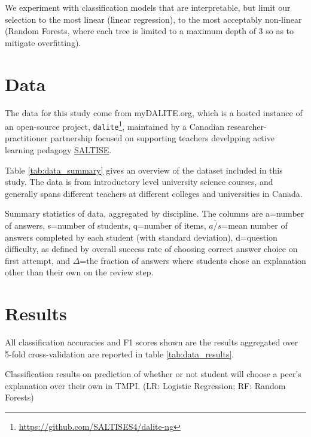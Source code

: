 \documentclass[sigconf]{acmart}
\begin{document}
We experiment with classification models that are interpretable, but limit our 
selection to the most linear (linear regression), to the most acceptably 
non-linear (Random Forests, where each tree is limited to a maximum depth of 3 
so as to mitigate overfitting).


\section{Data}

The data for this study come from myDALITE.org, which is a hosted instance of 
an open-source project, 
\verb|dalite|\footnote{\url{https://github.com/SALTISES4/dalite-ng}}, 
maintained by a Canadian researcher-practitioner partnership focused on 
supporting teachers develpping active learning pedagogy 
\href{saltise.ca}{SALTISE}.

Table \ref{tab:data_summary} gives an overview of the dataset included in this 
study.
The data is from introductory level university science courses, and generally 
spans different teachers at different colleges and universities in Canada. 
 
\begin{table}
	
	\caption{
		Summary statistics of data, aggregated by discipline. 
		The columns are a=number of answers, s=number of students, q=number of 
		items, $\overline{a/s}$=mean number of answers completed by each 
		student (with standard deviation), d=question difficulty, as defined by 
		overall success rate of choosing correct answer choice on first 
		attempt, and $\Delta$=the fraction of answers where students chose an 
		explanation other than their own on the review step. 
	}
	\label{tab:data_summary}
\end{table}

\section{Results}
All classification accuracies and F1 scores shown are the results aggregated 
over 5-fold cross-validation are reported in table \ref{tab:data_results}.

\begin{table}
	
	\caption{Classification results on prediction of whether or not student 
	will choose a peer's explanation over their own in TMPI. (LR: Logistic 
	Regression; RF: Random Forests)}
	\label{tab:data_results}
\end{table}
\end{document}
